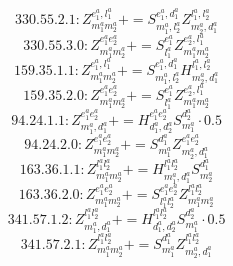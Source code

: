 \documentclass[letterpaper,10pt,fleqn,leqno,onecolumn]{article}
\begin{document}
\begin{equation} \;\;\;\;\;\;  330.55.2.1: Z^{e_{1}^{a},l_{1}^{a}}_{m_{1}^{a}m_{2}^{a}}+=S^{e_{1}^{a},d_{1}^{a}}_{m_{1}^{a},l_{2}^{a}}Z^{l_{1}^{a},l_{2}^{a}}_{m_{2}^{a},d_{1}^{a}} \end{equation}
\begin{equation} \;\;\;\;\;\;  330.55.3.0: Z^{e_{1}^{a}e_{2}^{a}}_{m_{1}^{a}m_{2}^{a}}+=S^{e_{1}^{a}}_{l_{1}^{a}}Z^{e_{2}^{a},l_{1}^{a}}_{m_{1}^{a}m_{2}^{a}} \end{equation}
\begin{equation} \;\;\;\;\;\;  159.35.1.1: Z^{e_{1}^{a},l_{1}^{a}}_{m_{1}^{a}m_{2}^{a}}+=S^{e_{1}^{a},d_{1}^{a}}_{m_{1}^{a},l_{2}^{a}}H^{l_{1}^{a},l_{2}^{a}}_{m_{2}^{a},d_{1}^{a}} \end{equation}
\begin{equation} \;\;\;\;\;\;  159.35.2.0: Z^{e_{1}^{a}e_{2}^{a}}_{m_{1}^{a}m_{2}^{a}}+=S^{e_{1}^{a}}_{l_{1}^{a}}Z^{e_{2}^{a},l_{1}^{a}}_{m_{1}^{a}m_{2}^{a}} \end{equation}
\begin{equation} \;\;\;\;\;\;  94.24.1.1: Z^{e_{1}^{a}e_{2}^{a}}_{m_{1}^{a},d_{1}^{a}}+=H^{e_{1}^{a}e_{2}^{a}}_{d_{1}^{a},d_{2}^{a}}S^{d_{2}^{a}}_{m_{1}^{a}}\cdot 0.5 \end{equation}
\begin{equation} \;\;\;\;\;\;  94.24.2.0: Z^{e_{1}^{a}e_{2}^{a}}_{m_{1}^{a}m_{2}^{a}}+=S^{d_{1}^{a}}_{m_{1}^{a}}Z^{e_{1}^{a}e_{2}^{a}}_{m_{2}^{a},d_{1}^{a}} \end{equation}
\begin{equation} \;\;\;\;\;\;  163.36.1.1: Z^{l_{1}^{a}l_{2}^{a}}_{m_{1}^{a}m_{2}^{a}}+=H^{l_{1}^{a}l_{2}^{a}}_{m_{1}^{a},d_{1}^{a}}S^{d_{1}^{a}}_{m_{2}^{a}} \end{equation}
\begin{equation} \;\;\;\;\;\;  163.36.2.0: Z^{e_{1}^{a}e_{2}^{a}}_{m_{1}^{a}m_{2}^{a}}+=S^{e_{1}^{a}e_{2}^{a}}_{l_{1}^{a}l_{2}^{a}}Z^{l_{1}^{a}l_{2}^{a}}_{m_{1}^{a}m_{2}^{a}} \end{equation}
\begin{equation} \;\;\;\;\;\;  341.57.1.2: Z^{l_{1}^{a}l_{2}^{a}}_{m_{1}^{a},d_{1}^{a}}+=H^{l_{1}^{a}l_{2}^{a}}_{d_{1}^{a},d_{2}^{a}}S^{d_{2}^{a}}_{m_{1}^{a}}\cdot 0.5 \end{equation}
\begin{equation} \;\;\;\;\;\;  341.57.2.1: Z^{l_{1}^{a}l_{2}^{a}}_{m_{1}^{a}m_{2}^{a}}+=S^{d_{1}^{a}}_{m_{1}^{a}}Z^{l_{1}^{a}l_{2}^{a}}_{m_{2}^{a},d_{1}^{a}} \end{equation}
\end{document}

